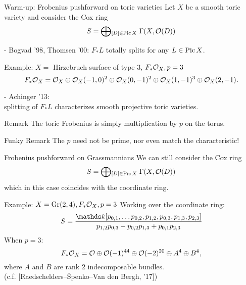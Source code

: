 \documentclass[beamer]{paper}
\def\OO{\mathcal{O}}
\begin{document}
\begin{frame}[t]{Warm-up: Frobenius pushforward on toric varieties}
  Let $X$ be a smooth toric variety and consider the Cox ring
  \[ S = \bigoplus\!{}_{[D]\in\Pic{X}} \; \Gamma(X, \OO(D)) \]

  - Bogvad '98, Thomsen '00: $F_*L$ totally splits for any $L\in\operatorname{Pic}X$.
  \begin{block}{Example: $X = $ Hirzebruch surface of type 3, $F_*\mathcal{O}_X, p = 3$}
    \vspace*{-0.2in}
    \[ F_*\mathcal{O}_X = \mathcal{O}_X \oplus \mathcal{O}_X(-1,0)^2 \oplus \mathcal{O}_X(0,-1)^2 \oplus \mathcal{O}_X(1,-1)^3 \oplus \mathcal{O}_X(2,-1). \]
  \end{block}

  - Achinger '13: \\ \hfill splitting of $F_*L$ characterizes smooth projective toric varieties.

  \vfill
  \begin{block}{Remark}
    The toric Frobenius is simply multiplication by $p$ on the torus.
  \end{block}
  \begin{alertblock}{Funky Remark}
    The $p$ need not be prime, nor even match the characteristic!
  \end{alertblock}
\end{frame}


\begin{frame}{Frobenius pushforward on Grassmannians}
  We can still consider the Cox ring
  \[ S = \bigoplus\!{}_{[D]\in\Pic{X}} \; \Gamma(X, \OO(D)) \]
  which in this case coincides with the coordinate ring.

  \begin{block}{Example: $X = \mathrm{Gr(2,4)}, F_*\mathcal{O}_X, p = 3$}
    Working over the coordinate ring:
    \[ S = \frac{\kk[p_{0,1},\dots p_{0,2},p_{1,2},p_{0,3},p_{1,3},p_{2,3}]}{p_{1,2}p_{0,3}-p_{0,2}p_{1,3}+p_{0,1}p_{2,3}} \]
    When $p = 3$:
    \[ F_*\mathcal{O}_X = \mathcal{O} \oplus \mathcal{O}(-1)^{44} \oplus \mathcal{O}(-2)^{20} \oplus A^4 \oplus B^4, \]
    where $A$ and $B$ are rank 2 indecomposable bundles. \\
    \hfill (c.f. [Raedschelders--Špenko--Van den Bergh, '17])
  \end{block}
\end{frame}
\end{document}
